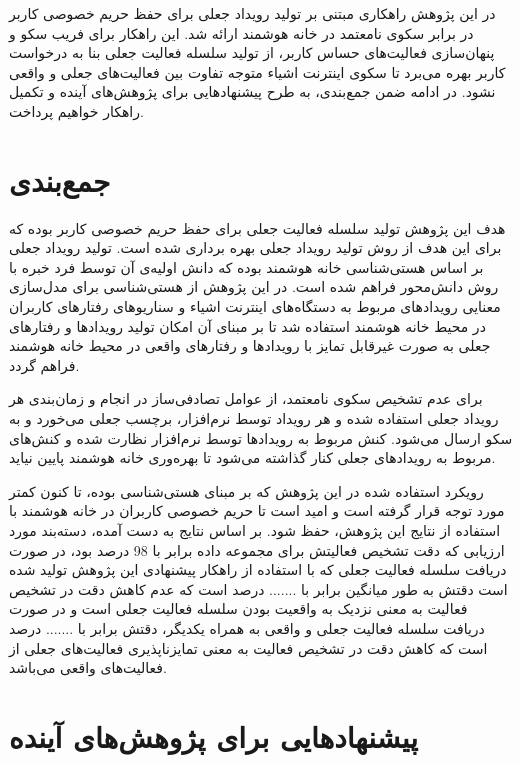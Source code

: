 
در این پژوهش راهکاری مبتنی بر تولید رویداد جعلی برای حفظ حریم خصوصی کاربر در برابر سکوی نامعتمد در خانه هوشمند ارائه شد. این راهکار برای فریب سکو و پنهان‌سازی فعالیت‌های حساس کاربر، از تولید سلسله فعالیت جعلی بنا به درخواست کاربر بهره می‌برد تا سکوی اینترنت اشیاء متوجه تفاوت بین فعالیت‌های جعلی و واقعی نشود. در ادامه ضمن جمع‌بندی، به طرح پیشنهادهایی برای پژوهش‌های آینده و تکمیل راهکار خواهیم پرداخت.

\section{جمع‌بندی}

هدف این پژوهش تولید سلسله فعالیت جعلی برای حفظ حریم خصوصی کاربر بوده که برای این هدف از روش تولید رویداد جعلی بهره برداری شده است. تولید رویداد جعلی بر اساس هستی‌شناسی خانه هوشمند بوده که دانش اولیه‌ی آن توسط فرد خبره با روش دانش‌محور فراهم شده است. در این پژوهش از هستی‌شناسی برای مدل‌سازی معنایی رویدادهای مربوط به دستگاه‌های اینترنت اشیاء و سناریوهای رفتارهای کاربران در محیط خانه هوشمند استفاده شد تا بر مبنای آن امکان تولید رویدادها و رفتارهای جعلی به صورت غیرقابل تمایز با رویدادها و رفتارهای واقعی در محیط خانه هوشمند فراهم گردد.

برای عدم تشخیص سکوی نامعتمد، از عوامل تصادفی‌ساز در انجام و زمان‌بندی هر رویداد جعلی استفاده شده و هر رویداد توسط نرم‌افزار، برچسب جعلی می‌خورد و به سکو ارسال می‌شود. کنش مربوط به رویدادها توسط نرم‌افزار نظارت شده و کنش‌های مربوط به رویدادهای جعلی کنار گذاشته می‌شود تا بهره‌وری خانه هوشمند پایین نیاید.

رویکرد استفاده شده در این پژوهش که بر مبنای هستی‌شناسی بوده، تا کنون کمتر مورد توجه قرار گرفته است و امید است تا حریم خصوصی کاربران در خانه هوشمند با استفاده از نتایج این پژوهش، حفظ شود. بر اساس نتایج به دست آمده، دسته‌بند مورد ارزیابی که دقت تشخیص فعالیتش برای مجموعه داده  برابر با 98 درصد بود، در صورت دریافت سلسله فعالیت جعلی که با استفاده از راهکار پیشنهادی این پژوهش تولید شده است دقتش به طور میانگین برابر با ....... درصد است که عدم کاهش دقت در تشخیص فعالیت به معنی نزدیک به واقعیت بودن سلسله فعالیت جعلی است و در صورت دریافت سلسله فعالیت جعلی و واقعی به همراه یکدیگر، دقتش برابر با ....... درصد است که کاهش دقت در تشخیص فعالیت به معنی تمایزناپذیری فعالیت‌های جعلی از فعالیت‌های واقعی می‌باشد.

\section{پیشنهادهایی برای پژوهش‌های آینده}

